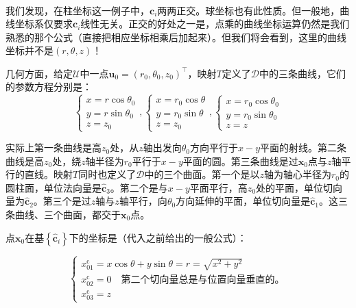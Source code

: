 \documentclass[main.tex]{subfiles}
\begin{document}
\begin{example}[柱坐标]
\begin{equation*}
\begin{array}{lll}
\end{array}\end{equation*}
我们发现，在柱坐标这一例子中，$\mathbf{c}_i$两两正交。球坐标也有此性质。但一般地，曲线坐标系仅要求$\mathbf{c}_i$线性无关。正交的好处之一是，点乘的曲线坐标运算仍然是我们熟悉的那个公式（直接把相应坐标相乘后加起来）。但我们将会看到，这里的曲线坐标并不是$\left(r,\theta,z\right)$！

几何方面，给定$\mathcal{U}$中一点$\mathbf{u}_0=\left(r_0,\theta_0,z_0\right)^\intercal$，映射$T$定义了$\mathcal{D}$中的三条曲线，它们的参数方程分别是：
\[
\left\{\begin{array}{l}
x=r\cos\theta_0\\
y=r\sin\theta_0\\
z=z_0\end{array}\right.,
\left\{\begin{array}{l}
x=r_0\cos\theta\\
y=r_0\sin\theta\\
z=z_0\end{array}\right.,
\left\{\begin{array}{l}
x=r_0\cos\theta_0\\
y=r_0\sin\theta_0\\
z=z\end{array}\right.\]

实际上第一条曲线是高$z_0$处，从$z$轴出发向$\theta_0$方向平行于$x-y$平面的射线。第二条曲线是高$z_0$处，绕$z$轴半径为$r_0$平行于$x-y$平面的圆。第三条曲线是过$\mathbf{x}_0$点与$z$轴平行的直线。映射$T$同时也定义了$\mathcal{D}$中的三个曲面。第一个是以$z$轴为轴心半径为$r_0$的圆柱面，单位法向量是$\mathbf{\hat{c}}_3$。第二个是与$x-y$平面平行，高$z_0$处的平面，单位切向量为$\mathbf{\hat{c}}_2$。第三个是过$z$轴与$z$轴平行，向$\theta_0$方向延伸的平面，单位切向量是$\mathbf{\hat{c}}_1$。这三条曲线、三个曲面，都交于$\mathbf{x}_0$点。

点$\mathbf{x}_0$在基$\left\{\mathbf{\hat{c}}_i\right\}$下的坐标是（代入之前给出的一般公式）：

\[
\left\{\begin{array}{l}
x_{01}^\mathrm{c}=x\cos\theta+y\sin\theta=r=\sqrt{x^2+y^2}\\
x_{02}^\mathrm{c}=0\quad\text{第二个切向量总是与位置向量垂直的。}\\
x_{03}^\mathrm{c}=z\end{array}\right.
\]


\end{example}
\end{document}
